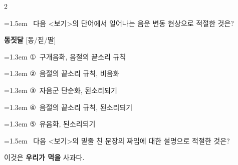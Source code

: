 \documentclass[10pt, a4paper]{article}
\begin{document}
\begin{multicols}{2}
\noindent\begin{minipage}{\columnwidth}
\vspace{2mm}
{\hangindent=1.5em  ~다음 <보기>의 단어에서 일어나는 음운 변동 현상으로 적절한 것은?\par}

\vspace{1mm}
\begin{boxibox}
\textbf{동짓달} [동/짇/딸] \\
\end{boxibox}
\vspace{1mm}

\vspace{0.5mm}
{\hangindent=1.3em  \noindent\hspace{0.3em}①~구개음화, 음절의 끝소리 규칙\par}
{\hangindent=1.3em  \noindent\hspace{0.3em}②~음절의 끝소리 규칙, 비음화\par}
{\hangindent=1.3em  \noindent\hspace{0.3em}③~자음군 단순화, 된소리되기\par}
{\hangindent=1.3em  \noindent\hspace{0.3em}④~음절의 끝소리 규칙, 된소리되기\par}
{\hangindent=1.3em  \noindent\hspace{0.3em}⑤~유음화, 된소리되기\par}
\vspace{4mm}
\end{minipage}
\par

\noindent\begin{minipage}{\columnwidth}
\vspace{2mm}
{\hangindent=1.5em  ~다음 <보기>의 밑줄 친 문장의 짜임에 대한 설명으로 적절한 것은?\par}

\vspace{1mm}
\begin{boxibox}
이것은 \textbf{우리가 먹을} 사과다. \\
\end{boxibox}
\vspace{1mm}


\end{minipage}
\end{multicols}
\end{document}
